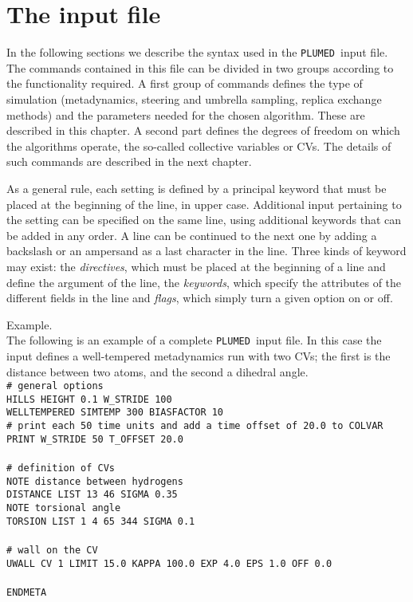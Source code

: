 \documentclass[12pt,fleqn]{report}
\newcommand{\plumed}{{\tt PLUMED}}
\newcommand{\esempio}[1]{
\vspace{10pt}
\begin{flushright}
\colorbox{light-gray}{
   \begin{minipage}{13cm}
       \scriptsize{
{\fontfamily{phv} \fontseries{b}
 \selectfont Example. \\
 \fontseries{m} \selectfont #1 } }
\end{minipage}}
\end{flushright}
\vspace{20pt}
}
\begin{document}
\section{The input file}
In the following sections we describe the syntax used in the \plumed \ input file.
\\
The commands contained in this file can be divided in two groups according to the
functionality required.
A first group of commands defines the type of simulation (metadynamics, steering
and umbrella sampling, replica exchange methods) and the parameters needed for
the chosen algorithm. These are described in this chapter.  A second part  defines 
the degrees of freedom on which the algorithms operate, the so-called 
collective variables or CVs. The details of such commands are described in the
next chapter.

As a general rule, each setting is defined by a principal keyword that must be
placed at the beginning of the line, in upper case. Additional input pertaining
to the setting can be specified on the same line, using additional keywords
that can be added in any order. A line can be continued to the next one by adding
a backslash or an ampersand as a last character in the line.
Three kinds of keyword may exist: the \emph{directives}, 
which must be placed at the beginning of a line and define the argument of the line, the
\emph{keywords}, which specify the attributes of the different fields in the line
and \emph{flags}, which simply turn a given option on or off.

\esempio{The following is an example of a complete \plumed  \ input file. In this case
the input defines a well-tempered metadynamics run with two CVs; the first 
is the distance between two atoms, and the second a dihedral angle. \vspace{10pt} \\
{\tt \# general options  \\
HILLS HEIGHT 0.1 W\_STRIDE 100 \\
WELLTEMPERED SIMTEMP 300 BIASFACTOR 10 \\

\# print each 50 time units and add a time offset of 20.0 to COLVAR \\
PRINT W\_STRIDE 50  T\_OFFSET 20.0 \\
\\
\# definition of CVs \\

NOTE distance between hydrogens \\
DISTANCE LIST 13 46 SIGMA 0.35 \\

NOTE torsional angle \\
TORSION LIST 1 4 65 344 SIGMA 0.1 \\
\\
\# wall on the CV\\
UWALL CV 1 LIMIT  15.0 KAPPA 100.0 EXP 4.0 EPS 1.0 OFF 0.0 \\
\\
ENDMETA
}}
\end{document}
